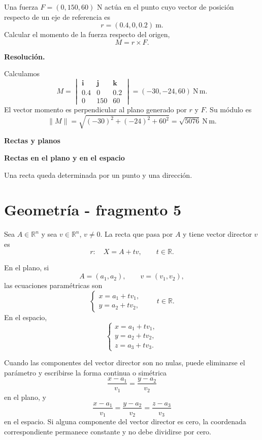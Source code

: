 \begin{solvedexercise}
Una fuerza $F=(0,150,60)$ N actúa en el punto cuyo vector de posición respecto de un eje de referencia es
\[
r=(0.4,0,0.2)\ \mathrm{m}.
\]
Calcular el momento de la fuerza respecto del origen,
\[
M=r\times F.
\]

\textbf{Resolución.}\par\smallskip
Calculamos
\[
M=
\begin{vmatrix}
\mathbf i&\mathbf j&\mathbf k\\
0.4&0&0.2\\
0&150&60
\end{vmatrix}
=(-30,-24,60)\ \mathrm{N\,m}.
\]
El vector momento es perpendicular al plano generado por $r$ y $F$. Su módulo es
\[
\|M\|=\sqrt{(-30)^2+(-24)^2+60^2}
=\sqrt{5076}\ \mathrm{N\,m}.
\]
\end{solvedexercise}

\textbf{Rectas y planos}

\textbf{Rectas en el plano y en el espacio}

Una recta queda determinada por un punto y una dirección.


\section{Geometría - fragmento 5}
\begin{definition}
Sea $A\in\mathbb{R}^n$ y sea $v\in\mathbb{R}^n$, $v\neq0$. La recta que pasa por $A$ y tiene vector director $v$ es
\[
r:\quad X=A+tv,\qquad t\in\mathbb{R}.
\]
\end{definition}

En el plano, si
\[
A=(a_1,a_2),\qquad v=(v_1,v_2),
\]
las ecuaciones paramétricas son
\[
\begin{cases}
x=a_1+tv_1,\\
y=a_2+tv_2,
\end{cases}
\qquad t\in\mathbb{R}.
\]
En el espacio,
\[
\begin{cases}
x=a_1+tv_1,\\
y=a_2+tv_2,\\
z=a_3+tv_3.
\end{cases}
\]

Cuando las componentes del vector director son no nulas, puede eliminarse el parámetro y escribirse la forma continua o simétrica
\[
\frac{x-a_1}{v_1}
=
\frac{y-a_2}{v_2}
\]
en el plano, y
\[
\frac{x-a_1}{v_1}
=
\frac{y-a_2}{v_2}
=
\frac{z-a_3}{v_3}
\]
en el espacio. Si alguna componente del vector director es cero, la coordenada correspondiente permanece constante y no debe dividirse por cero.

